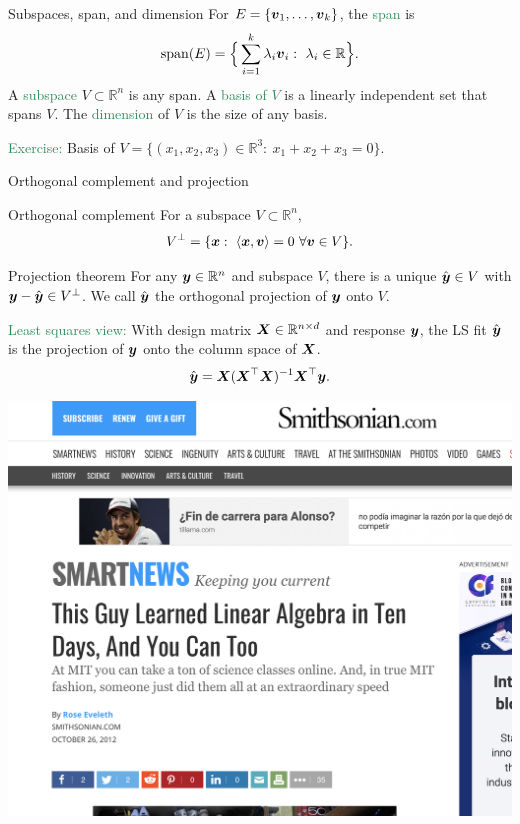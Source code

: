 \documentclass[11pt,aspectratio=169]{beamer}
\begin{document}
\begin{frame}{Subspaces, span, and dimension}
For $E=\{\boldsymbol v_1,\ldots,\boldsymbol v_k\}$, the \textcolor{SeaGreen}{span} is
\[
\mathrm{span}(E)=\Big\{\sum_{i=1}^k \lambda_i \boldsymbol v_i:\ \lambda_i\in\mathbb{R}\Big\}.
\]
A \textcolor{SeaGreen}{subspace} $V\subset\mathbb{R}^n$ is any span. A \textcolor{SeaGreen}{basis of $V$} is a linearly independent set that spans $V$.
The \textcolor{SeaGreen}{dimension} of $V$ is the size of any basis.
\bigskip

\textcolor{SeaGreen}{Exercise:} Basis of $V=\{(x_1,x_2,x_3)\in\mathbb{R}^3:\ x_1+x_2+x_3=0\}$.
\end{frame}



\begin{frame}[label=orthogonal]{Orthogonal complement and projection}
\begin{block}{Orthogonal complement}
For a subspace $V\subset\mathbb{R}^n$,
\[
V^\perp=\{\boldsymbol x:\ \langle \boldsymbol x,\boldsymbol v\rangle=0\ \forall \boldsymbol v\in V\}.
\]
\end{block}
\begin{alertblock}{Projection theorem}
For any $\boldsymbol y\in\mathbb{R}^n$ and subspace $V$, there is a unique $\hat{\boldsymbol y}\in V$ with $\boldsymbol y-\hat{\boldsymbol y}\in V^\perp$. We call $\hat{\boldsymbol y}$ the orthogonal projection of $\boldsymbol y$ onto $V$.
\end{alertblock}

\textcolor{SeaGreen}{Least squares view:} With design matrix $\boldsymbol X\in\mathbb{R}^{n\times d}$ and response $\boldsymbol y$, the LS fit $\hat{\boldsymbol y}$ is the projection of $\boldsymbol y$ onto the column space of $\boldsymbol X$.
\[
\hat{\boldsymbol y}=\boldsymbol X(\boldsymbol X^\top\boldsymbol X)^{-1}\boldsymbol X^\top\boldsymbol y.
\]
\end{frame}


\begin{frame}{}
\centering\includegraphics[height=\paperheight]{img/LinAlg10days.png}	
\end{frame}
\end{document}
